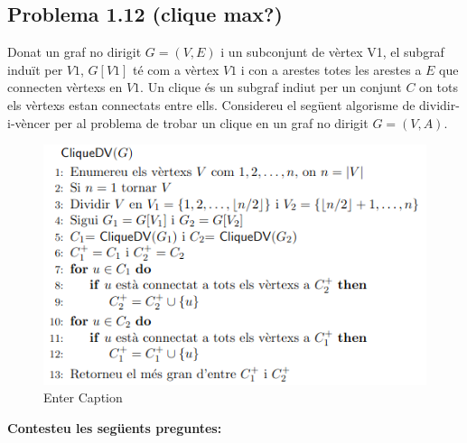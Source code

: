 \documentclass[a4paper,12pt]{article}
\begin{document}
\subsection*{Problema 1.12 (clique max?)}
Donat un graf no dirigit $G = (V, E)$ i un subconjunt de vèrtex V1, el subgraf
induït per $V1$, $G[V1]$ té com a vèrtex $V1$ i con a arestes totes les arestes a $E$ que connecten
vèrtexs en $V1$. Un clique és un subgraf indiut per un conjunt $C$ on tots els vèrtexs estan
connectats entre ells.
Considereu el següent algorisme de dividir-i-vèncer per al problema de trobar un clique en un
graf no dirigit $G = (V, A)$.
\begin{figure}[H]
    \centering
    \includegraphics[width=0.8\linewidth]{ksnip_20250219-180045.png}
    \caption{Enter Caption}
    \label{fig:enter-label}
\end{figure}
\textbf{Contesteu les següents preguntes:}
\end{document}
